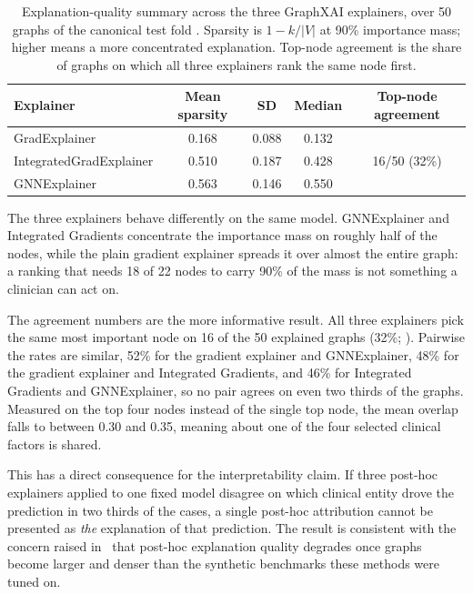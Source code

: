 \begin{table}[htbp]
  \centering
  \caption{Explanation-quality summary across the three GraphXAI explainers,
    over 50 graphs of the canonical test fold . Sparsity is
    $1 - k/|V|$ at 90\% importance mass; higher means a more concentrated
    explanation. Top-node agreement is the share of graphs on which all three
    explainers rank the same node first.}
  \label{tab:expl-quality}
  \begin{tabular}{lcccc}
    \toprule
    Explainer & Mean sparsity & SD & Median & Top-node agreement \\
    \midrule
    GradExplainer            & 0.168 & 0.088 & 0.132 & \multirow{3}{*}{16/50 (32\%)} \\
    IntegratedGradExplainer  & 0.510 & 0.187 & 0.428 & \\
    GNNExplainer             & 0.563 & 0.146 & 0.550 & \\
    \bottomrule
  \end{tabular}
\end{table}

The three explainers behave differently on the same model. GNNExplainer and
Integrated Gradients concentrate the importance mass on roughly half of the
nodes, while the plain gradient explainer spreads it over almost the entire
graph: a ranking that needs 18 of 22 nodes to carry 90\% of the mass is not
something a clinician can act on.

The agreement numbers are the more informative result. All three explainers pick
the same most important node on 16 of the 50 explained graphs (32\%; ). Pairwise the rates
are similar, 52\% for the gradient explainer and GNNExplainer, 48\% for the
gradient explainer and Integrated Gradients, and 46\% for Integrated Gradients
and GNNExplainer, so no pair agrees on even two thirds of the graphs. Measured
on the top four nodes instead of the single top node, the mean overlap falls to
between 0.30 and 0.35, meaning about one of the four selected clinical factors
is shared.

This has a direct consequence for the interpretability claim. If three post-hoc
explainers applied to one fixed model disagree on which clinical entity drove
the prediction in two thirds of the cases, a single post-hoc attribution cannot
be presented as \emph{the} explanation of that prediction. The result is
consistent with the concern raised in~\cite{agarwal2023graphxai} that post-hoc
explanation quality degrades once graphs become larger and denser than the
synthetic benchmarks these methods were tuned on.

